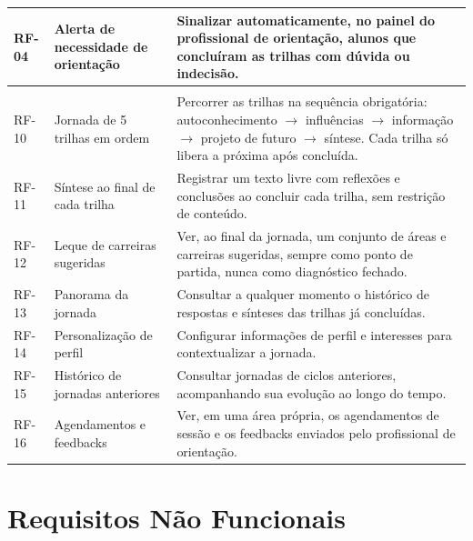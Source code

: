 {\begin{xltabular}{\textwidth}{|>{\centering\arraybackslash}p{1.2cm}|>{\raggedright\arraybackslash}p{3.6cm}|>{\raggedright\arraybackslash}X|}
\hline
RF-04 & Alerta de necessidade de orientação & Sinalizar automaticamente, no painel do profissional de orientação, alunos que concluíram as trilhas com dúvida ou indecisão. \\
\hline
{} \\
\hline
RF-10 & Jornada de 5 trilhas em ordem & Percorrer as trilhas na sequência obrigatória: autoconhecimento $\rightarrow$ influências $\rightarrow$ informação $\rightarrow$ projeto de futuro $\rightarrow$ síntese. Cada trilha só libera a próxima após concluída. \\
\hline
RF-11 & Síntese ao final de cada trilha & Registrar um texto livre com reflexões e conclusões ao concluir cada trilha, sem restrição de conteúdo. \\
\hline
RF-12 & Leque de carreiras sugeridas & Ver, ao final da jornada, um conjunto de áreas e carreiras sugeridas, sempre como ponto de partida, nunca como diagnóstico fechado. \\
\hline
RF-13 & Panorama da jornada & Consultar a qualquer momento o histórico de respostas e sínteses das trilhas já concluídas. \\
\hline
RF-14 & Personalização de perfil & Configurar informações de perfil e interesses para contextualizar a jornada. \\
\hline
RF-15 & Histórico de jornadas anteriores & Consultar jornadas de ciclos anteriores, acompanhando sua evolução ao longo do tempo. \\
\hline
RF-16 & Agendamentos e feedbacks & Ver, em uma área própria, os agendamentos de sessão e os feedbacks enviados pelo profissional de orientação. \\
\hline
\end{xltabular}
}

\section{Requisitos Não Funcionais}\label{sec:rnf}

